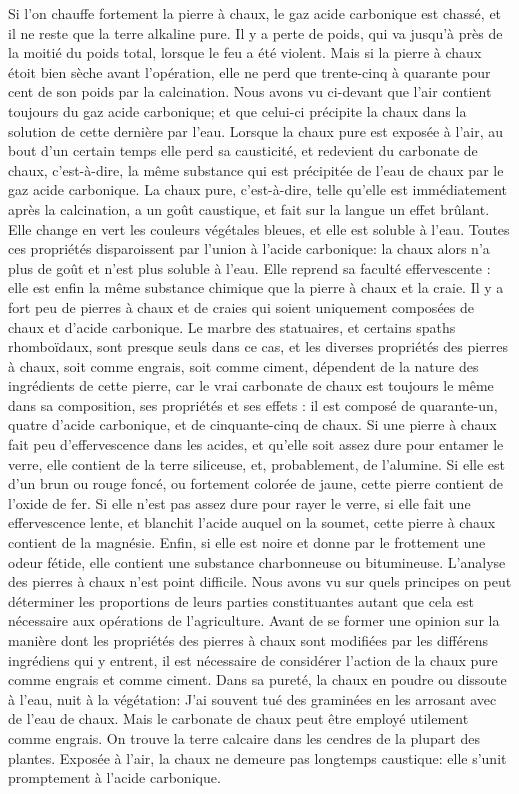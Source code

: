 Si l'on chauffe fortement la pierre à chaux, le gaz acide carbonique est chassé, et il ne reste que la terre alkaline pure. Il y a perte de poids, qui va jusqu'à près de la moitié du poids total, lorsque le feu a été violent. Mais si la pierre à chaux étoit bien sèche avant l'opération, elle ne perd que trente-cinq à quarante pour cent de son poids par la calcination.\setcounter{page}{217} Nous avons vu ci-devant que l'air contient toujours du gaz acide carbonique; et que celui-ci précipite la chaux dans la solution de cette dernière par l'eau. Lorsque la chaux pure est exposée à l'air, au bout d'un certain temps elle perd sa causticité, et redevient du carbonate de chaux, c'est-à-dire, la même substance qui est précipitée de l'eau de chaux par le gaz acide carbonique. La chaux pure, c'est-à-dire, telle qu'elle est immédiatement après la calcination, a un goût caustique, et fait sur la langue un effet brûlant. Elle change en vert les couleurs végétales bleues, et elle est soluble à l'eau. Toutes ces propriétés disparoissent par l'union à l'acide carbonique: la chaux alors n'a plus de goût et n'est plus soluble à l'eau. Elle reprend sa faculté effervescente : elle est enfin la même substance chimique que la pierre à chaux et la craie.
Il y a fort peu de pierres à chaux et de craies qui soient uniquement composées de chaux et d'acide carbonique.
Le marbre des statuaires, et certains spaths rhomboïdaux, sont presque seuls dans ce cas, et les diverses propriétés des pierres à chaux, soit comme engrais, soit comme ciment, dépendent de la nature des ingrédients de cette pierre, car le vrai carbonate\setcounter{page}{218} de chaux est toujours le même dans sa composition, ses propriétés et ses effets : il est composé de quarante-un, quatre d'acide carbonique, et de cinquante-cinq de chaux. Si une pierre à chaux fait peu d'effervescence dans les acides, et qu'elle soit assez dure pour entamer le verre, elle contient de la terre siliceuse, et, probablement, de l'alumine. Si elle est d'un brun ou rouge foncé, ou fortement colorée de jaune, cette pierre contient de l'oxide de fer. Si elle n'est pas assez dure pour rayer le verre, si elle fait une effervescence lente, et blanchit l'acide auquel on la soumet, cette pierre à chaux contient de la magnésie. Enfin, si elle est noire et donne par le frottement une odeur fétide, elle contient une substance charbonneuse ou bitumineuse. L'analyse des pierres à chaux n'est point difficile. Nous avons vu sur quels principes on peut déterminer les proportions de leurs parties constituantes autant que cela est nécessaire aux opérations de l'agriculture. Avant de se former une opinion sur la manière dont les propriétés des pierres à chaux sont modifiées par les différens ingrédiens qui y entrent, il est nécessaire de considérer l'action de la chaux pure comme engrais et comme ciment.\setcounter{page}{219} Dans sa pureté, la chaux en poudre ou dissoute à l'eau, nuit à la végétation: J'ai souvent tué des graminées en les arrosant avec de l'eau de chaux. Mais le carbonate de chaux peut être employé utilement comme engrais. On trouve la terre calcaire dans les cendres de la plupart des plantes. Exposée à l'air, la chaux ne demeure pas longtemps caustique: elle s'unit promptement à l'acide carbonique.

